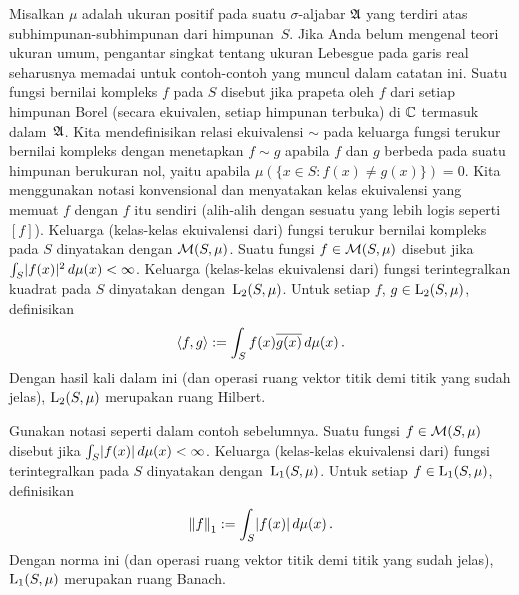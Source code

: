 \begin{exam}\label{00022} Misalkan $\mu$ adalah ukuran positif pada suatu $\sigma$-aljabar $\mathfrak{A}$ yang terdiri atas
subhimpunan-subhimpunan dari himpunan~$S$.  Jika Anda belum mengenal teori ukuran umum, pengantar singkat tentang ukuran Lebesgue
pada garis real seharusnya memadai untuk contoh-contoh yang muncul dalam catatan ini.  Suatu fungsi bernilai kompleks $f$ pada $S$ disebut
 jika prapeta oleh $f$ dari setiap himpunan Borel (secara ekuivalen, setiap himpunan
terbuka) di $\mathbb{C}$ termasuk dalam~$\mathfrak{A}$. Kita mendefinisikan relasi ekuivalensi $\sim$ pada keluarga
fungsi terukur bernilai kompleks dengan menetapkan $f \sim g$ apabila $f$ dan $g$ berbeda pada suatu himpunan
berukuran nol, yaitu apabila $\mu(\{x \in S\colon f(x) \ne g(x)\}) = 0$.  Kita menggunakan
notasi konvensional dan menyatakan kelas ekuivalensi yang memuat $f$ dengan $f$ itu sendiri (alih-alih
dengan sesuatu yang lebih logis seperti~$[f]$).  Keluarga (kelas-kelas ekuivalensi dari) fungsi
terukur bernilai kompleks pada $S$ dinyatakan dengan $\mathcal{M}(S,\mu)$. Suatu fungsi $f \in \mathcal{M}(S,\mu)$ disebut
 jika $\int_S \lvert f(x)\rvert^2\,d\mu(x) < \infty$.  Keluarga
(kelas-kelas ekuivalensi dari) fungsi terintegralkan kuadrat pada $S$ dinyatakan dengan~$\mathrm{L_{2}}(S,\mu)$.
Untuk setiap $f$, $g \in \mathrm{L_{2}}(S,\mu)$, definisikan
   \[ \langle f,g \rangle := \int_S f(x) \overline{g(x)}\,d\mu(x)\,. \]
Dengan hasil kali dalam ini (dan operasi ruang vektor titik demi titik yang sudah jelas), $\mathrm{L_{2}}(S,\mu)$ merupakan ruang Hilbert.
\end{exam}

\begin{exam}\label{exam_L1S} Gunakan notasi seperti dalam contoh sebelumnya.  Suatu fungsi $f \in \mathcal{M}(S,\mu)$ disebut
 jika $\int_S \lvert f(x)\rvert\,d\mu(x) < \infty$.  Keluarga
(kelas-kelas ekuivalensi dari) fungsi terintegralkan pada $S$ dinyatakan dengan~$\mathrm{L_{1}}(S,\mu)$.
Untuk setiap $f \in \mathrm{L_{1}}(S,\mu)$, definisikan
    \[ {\lVert f\rVert}_1 := \int_S \lvert f(x)\rvert\,d\mu(x)\,. \]
Dengan norma ini (dan operasi ruang vektor titik demi titik yang sudah jelas), $\mathrm{L_{1}}(S,\mu)$ merupakan ruang Banach.
\end{exam}

